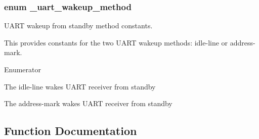 \subsubsection[{\texorpdfstring{\+\_\+uart\+\_\+wakeup\+\_\+method}{_uart_wakeup_method}}]{\setlength{\rightskip}{0pt plus 5cm}enum {\bf \+\_\+uart\+\_\+wakeup\+\_\+method}}\hypertarget{group__uart__hal_gac4479526dd3c0c5406e7c553e2c797d5}{}\label{group__uart__hal_gac4479526dd3c0c5406e7c553e2c797d5}


U\+A\+RT wakeup from standby method constants. 

This provides constants for the two U\+A\+RT wakeup methods\+: idle-\/line or address-\/mark. \begin{Desc}
\item[Enumerator]\par
\begin{description}
\item[{\em 
k\+Uart\+Idle\+Line\+Wake\hypertarget{group__uart__hal_ggac4479526dd3c0c5406e7c553e2c797d5a09721a9294ef5eadb137e4a0a9744a58}{}\label{group__uart__hal_ggac4479526dd3c0c5406e7c553e2c797d5a09721a9294ef5eadb137e4a0a9744a58}
}]The idle-\/line wakes U\+A\+RT receiver from standby \item[{\em 
k\+Uart\+Addr\+Mark\+Wake\hypertarget{group__uart__hal_ggac4479526dd3c0c5406e7c553e2c797d5a51f8c90fb648dbd7d2f684d46f05975b}{}\label{group__uart__hal_ggac4479526dd3c0c5406e7c553e2c797d5a51f8c90fb648dbd7d2f684d46f05975b}
}]The address-\/mark wakes U\+A\+RT receiver from standby \end{description}
\end{Desc}


\subsection{Function Documentation}
